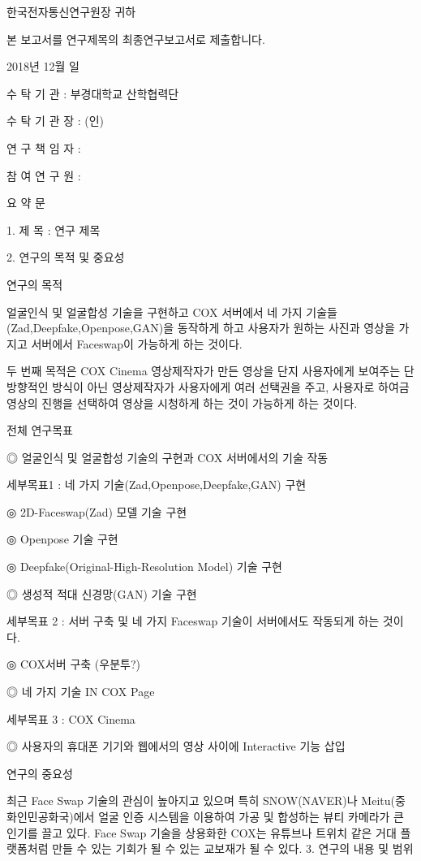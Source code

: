 한국전자통신연구원장  귀하

본 보고서를 연구제목의 최종연구보고서로 제출합니다. 

2018년 12월 일

수  탁  기  관 :  부경대학교 산학협력단

수 탁 기 관 장 :           (인)

연 구 책 임 자 :  

참 여 연 구 원 :  

요     약     문

1. 제   목 : 연구 제목 

2. 연구의 목적 및 중요성

연구의 목적

얼굴인식 및 얼굴합성 기술을 구현하고 COX 서버에서 네 가지 기술들(Zad,Deepfake,Openpose,GAN)을 동작하게 하고 사용자가 원하는 사진과 영상을 가지고 서버에서 Faceswap이 가능하게 하는 것이다. 

두 번째 목적은 COX Cinema 영상제작자가 만든 영상을 단지 사용자에게 보여주는 단방향적인 방식이 아닌 영상제작자가 사용자에게 여러 선택권을 주고, 사용자로 하여금 영상의 진행을 선택하여 영상을 시청하게 하는 것이 가능하게 하는 것이다. 

전체 연구목표

◎ 얼굴인식 및 얼굴합성 기술의 구현과 COX 서버에서의 기술 작동

세부목표1 : 네 가지 기술(Zad,Openpose,Deepfake,GAN) 구현

◎ 2D-Faceswap(Zad) 모델 기술 구현

◎ Openpose 기술 구현

◎ Deepfake(Original-High-Resolution Model) 기술 구현 

◎ 생성적 적대 신경망(GAN) 기술 구현 

세부목표 2 : 서버 구축 및 네 가지 Faceswap 기술이 서버에서도 작동되게 하는 것이다.

◎ COX서버 구축 (우분투?)

◎ 네 가지 기술 IN COX Page

세부목표 3 : COX Cinema 

◎ 사용자의 휴대폰 기기와 웹에서의 영상 사이에 Interactive 기능 삽입

연구의 중요성

최근 Face Swap 기술의 관심이 높아지고 있으며 특히 SNOW(NAVER)나 Meitu(중화인민공화국)에서 얼굴 인증 시스템을 이용하여 가공 및 합성하는 뷰티 카메라가 큰 인기를 끌고 있다. Face Swap 기술을 상용화한 COX는 유튜브나 트위치 같은 거대 플랫폼처럼 만들 수 있는 기회가 될 수 있는 교보재가 될 수 있다.
3. 연구의 내용 및 범위


